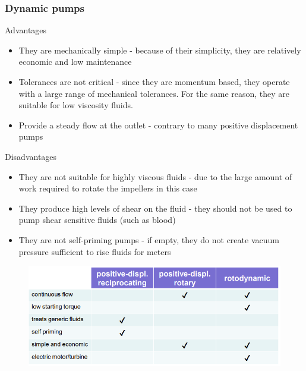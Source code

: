 \documentclass[class=report, crop=false, 12pt,a4paper]{standalone}
\begin{document}
\subsubsection*{Dynamic pumps}
Advantages
\begin{itemize}
  \item They are mechanically simple - because of their simplicity, they are relatively economic and low maintenance
  \item Tolerances are not critical - since they are momentum based, they operate with a large range of mechanical tolerances. For the same reason, they are suitable for low viscosity fluids. 
  \item Provide a steady flow at the outlet - contrary to many positive displacement pumps
\end{itemize}
Disadvantages
\begin{itemize}
  \item They are not suitable for highly viscous fluids - due to the large amount of work required to rotate the impellers in this case
  \item They produce high levels of shear on the fluid - they should not be used to pump shear sensitive fluids (such as blood)
  \item They are not self-priming pumps - if empty, they do not create vacuum pressure sufficient to rise fluids for meters
\end{itemize}
\begin{figure}[H]
  \centering
  \includegraphics[width = 0.8 \textwidth]{../img/tabletocomparepumps.png}
\end{figure}
\end{document}
